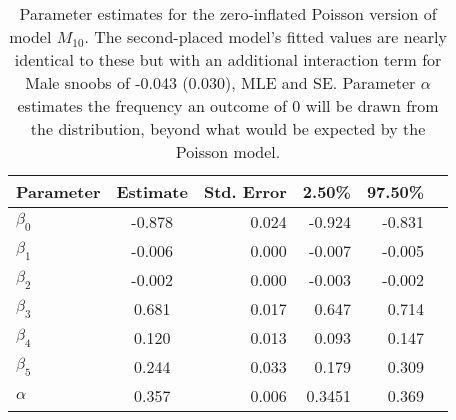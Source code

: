 \documentclass[11pt]{article}
\begin{document}
\begin{table}[htbp]
  \centering
    \begin{tabular}{lcrrrr}
    \hline
    \hline
    Parameter & Estimate & Std. Error & 2.50\% & 97.50\% \\
    \hline
    $\beta_0$    & -0.878 & 0.024 & -0.924 & -0.831 \\
    $\beta_1$    & -0.006 & 0.000 & -0.007 & -0.005 \\
    $\beta_2$    & -0.002 & 0.000 & -0.003 & -0.002 \\
    $\beta_3$    & 0.681 & 0.017 & 0.647 & 0.714 \\
    $\beta_4$    & 0.120 & 0.013 & 0.093 & 0.147 \\
    $\beta_5$    & 0.244 & 0.033 & 0.179 & 0.309 \\
    $\alpha$ & 0.357 & 0.006 & 0.3451 & 0.369 \\
    \hline
    \end{tabular}%
    \caption{Parameter estimates for the zero-inflated Poisson version of model $M_{10}$.  The second-placed model's fitted values are nearly identical to these but with an additional interaction term for Male snoobs of -0.043 (0.030), MLE and SE.  Parameter $\alpha$ estimates the frequency an outcome of 0 will be drawn from the distribution, beyond what would be expected by the Poisson model.} 
  \label{tab:m10ests}%
\end{table}%
\end{document}
